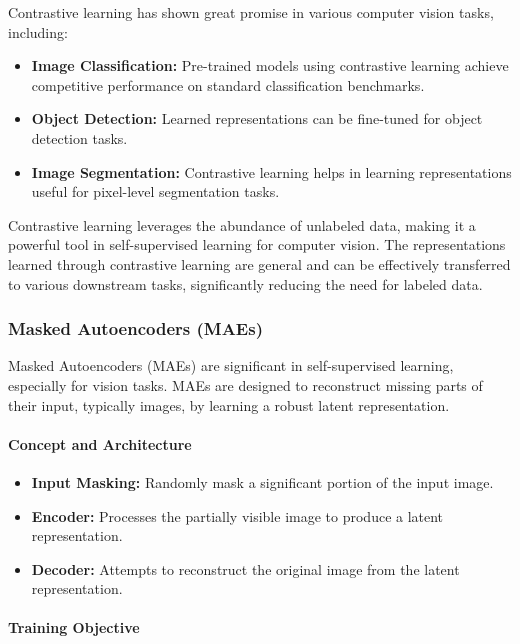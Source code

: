 \documentclass[12pt]{article}
\begin{document}
Contrastive learning has shown great promise in various computer vision tasks, including:

\begin{itemize}
    \item \textbf{Image Classification:} Pre-trained models using contrastive learning achieve competitive performance on standard classification benchmarks.
    \item \textbf{Object Detection:} Learned representations can be fine-tuned for object detection tasks.
    \item \textbf{Image Segmentation:} Contrastive learning helps in learning representations useful for pixel-level segmentation tasks.
\end{itemize}

Contrastive learning leverages the abundance of unlabeled data, making it a powerful tool in self-supervised learning for computer vision. The representations learned through contrastive learning are general and can be effectively transferred to various downstream tasks, significantly reducing the need for labeled data.

\subsubsection{Masked Autoencoders (MAEs)}

Masked Autoencoders (MAEs) are significant in self-supervised learning, especially for vision tasks. MAEs are designed to reconstruct missing parts of their input, typically images, by learning a robust latent representation.

\paragraph{Concept and Architecture}

\begin{itemize}
    \item \textbf{Input Masking:} Randomly mask a significant portion of the input image.
    \item \textbf{Encoder:} Processes the partially visible image to produce a latent representation.
    \item \textbf{Decoder:} Attempts to reconstruct the original image from the latent representation.
\end{itemize}

\paragraph{Training Objective}
\end{document}
